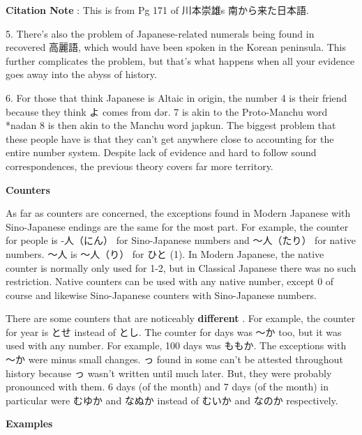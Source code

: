\par{\textbf{Citation Note }: This is from Pg 171 of 川本崇雄\textquotesingle s 南から来た日本語. }

\par{5. There's also the problem of Japanese-related numerals being found in recovered 高麗語, which would have been spoken in the Korean peninsula. This further complicates the problem, but that's what happens when all your evidence goes away into the abyss of history. }

\par{6. For those that think Japanese is Altaic in origin, the number 4 is their friend because they think よ comes from dər. 7 is akin to the Proto-Manchu word *nadan 8 is then akin to the Manchu word japkun. The biggest problem that these people have is that they can't get anywhere close to accounting for the entire number system. Despite lack of evidence and hard to follow sound correspondences, the previous theory covers far more territory. }

\par{ \textbf{Counters }}

\par{As far as counters are concerned, the exceptions found in Modern Japanese with Sino-Japanese endings are the same for the most part. For example, the counter for people is -人（にん） for Sino-Japanese numbers and ～人（たり） for native numbers. ～人 is ～人（り） for ひと (1). In Modern Japanese, the native counter is normally only used for 1-2, but in Classical Japanese there was no such restriction. Native counters can be used with any native number, except 0 of course and likewise Sino-Japanese counters with Sino-Japanese numbers. }

\par{There are some counters that are noticeably \textbf{different }. For example, the counter for year is とせ instead of とし. The counter for days was ～か too, but it was used with any number. For example, 100 days was ももか. The exceptions with ～か were minus small changes. っ found in some can't be attested throughout history because っ wasn't written until much later. But, they were probably pronounced with them. 6 days (of the month) and 7 days (of the month) in particular were むゆか and なぬか instead of むいか and なのか respectively. }

\begin{center}
\textbf{Examples }
\end{center}

